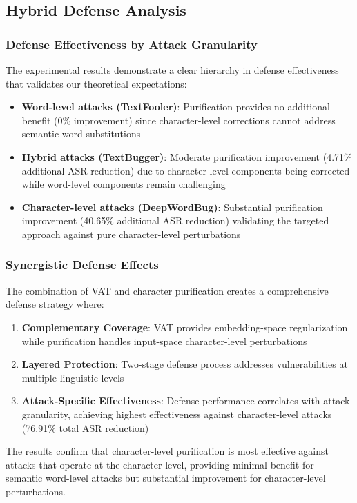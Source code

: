 \documentclass[../main.tex]{subfiles}
\begin{document}
\subsection{Hybrid Defense Analysis}

\subsubsection{Defense Effectiveness by Attack Granularity}

The experimental results demonstrate a clear hierarchy in defense effectiveness that validates our theoretical expectations:

\begin{itemize}
\item \textbf{Word-level attacks (TextFooler)}: Purification provides no additional benefit (0\% improvement) since character-level corrections cannot address semantic word substitutions
\item \textbf{Hybrid attacks (TextBugger)}: Moderate purification improvement (4.71\% additional ASR reduction) due to character-level components being corrected while word-level components remain challenging
\item \textbf{Character-level attacks (DeepWordBug)}: Substantial purification improvement (40.65\% additional ASR reduction) validating the targeted approach against pure character-level perturbations
\end{itemize}

\subsubsection{Synergistic Defense Effects}

The combination of VAT and character purification creates a comprehensive defense strategy where:

\begin{enumerate}
\item \textbf{Complementary Coverage}: VAT provides embedding-space regularization while purification handles input-space character-level perturbations
\item \textbf{Layered Protection}: Two-stage defense process addresses vulnerabilities at multiple linguistic levels
\item \textbf{Attack-Specific Effectiveness}: Defense performance correlates with attack granularity, achieving highest effectiveness against character-level attacks (76.91\% total ASR reduction)
\end{enumerate}

The results confirm that character-level purification is most effective against attacks that operate at the character level, providing minimal benefit for semantic word-level attacks but substantial improvement for character-level perturbations.
\end{document}
